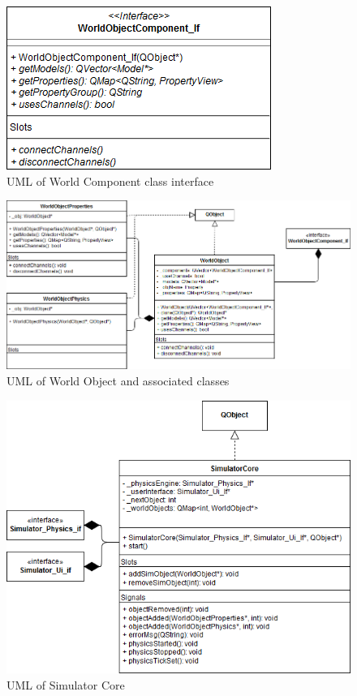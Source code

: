   \begin{figure}
 	\begin{center}
 	\includegraphics[scale=0.5]{./images_design/uml/WorldComponent_If}
 	\caption{UML of World Component class interface\label{uml:worldcomponent_if}}
 	\end{center}
 \end{figure} 
 
   \begin{figure}
 	\begin{center}
 	\includegraphics[scale=0.5]{./images_design/uml/WorldObj}
 	\caption{UML of World Object and associated classes\label{uml:worldobj}}
 	\end{center}
 \end{figure}
 
 \begin{figure}
 	\begin{center}
 	\includegraphics[scale=0.5]{./images_design/uml/SimCore}
 	\caption{UML of Simulator Core\label{uml:simcore}}
 	\end{center}
 \end{figure}
 
